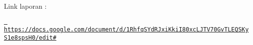 Link laporan \+:

\href{https://docs.google.com/document/d/1RhfqSYdRJxiKkiI80xcLJTV70GvTLEQSKyS1e8spsH0/edit\#}{\texttt{ https\+://docs.\+google.\+com/document/d/1\+Rhfq\+S\+Yd\+R\+Jxi\+Kki\+I80xc\+L\+J\+T\+V70\+Gv\+T\+L\+E\+Q\+S\+Ky\+S1e8sps\+H0/edit\#}} 